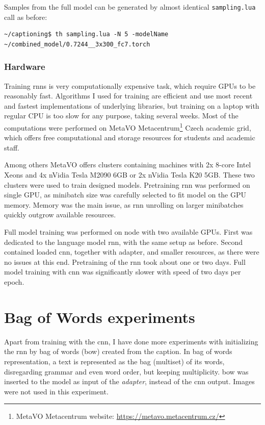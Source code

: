 Samples from the full model can be generated by almost identical \texttt{sampling.lua} call as before:

\hspace{1cm}
\begin{lstlisting}[firstnumber=1,breakindent=60pt,frame=single]
~/captioning$ th sampling.lua -N 5 -modelName ~/combined_model/0.7244__3x300_fc7.torch
\end{lstlisting}
\hspace{1cm}

\subsubsection{Hardware}

Training \gls{rnn}s is very computationally expensive task, which require GPUs to be reasonably fast. Algorithms I used for training are efficient and use most recent and fastest implementations of underlying libraries, but training on a laptop with regular CPU is too slow for any purpose, taking several weeks. Most of the computations were performed on MetaVO Metacentrum\footnote{MetaVO Metacentrum website: \url{https://metavo.metacentrum.cz/}} Czech academic grid, which offers free computational and storage resources for students and academic staff. 

Among others MetaVO offers clusters containing machines with 2x 8-core Intel Xeons and 4x nVidia Tesla M2090 6GB or 2x nVidia Tesla K20 5GB. These two clusters were used to train designed models. Pretraining \gls{rnn} was performed on single GPU, as minibatch size was carefully selected to fit model on the GPU memory. Memory was the main issue, as \gls{rnn} unrolling on larger minibatches quickly outgrow available resources.

Full model training was performed on node with two available GPUs. First was dedicated to the language model \gls{rnn}, with the same setup as before. Second contained loaded \gls{cnn}, together with adapter, and smaller resources, as there were no issues at this end. Pretraining of the \gls{rnn} took about one or two days. Full model training with \gls{cnn} was significantly slower with speed of two days per epoch.

\section{Bag of Words experiments}

Apart from training with the \gls{cnn}, I have done more experiments with initializing the \gls{rnn} by bag of words (\gls{bow}) created from the caption. In bag of words representation, a text is represented as the bag (multiset) of its words, disregarding grammar and even word order, but keeping multiplicity. \gls{bow} was inserted to the model as input of the \emph{adapter}, instead of the \gls{cnn} output. Images were not used in this experiment.

